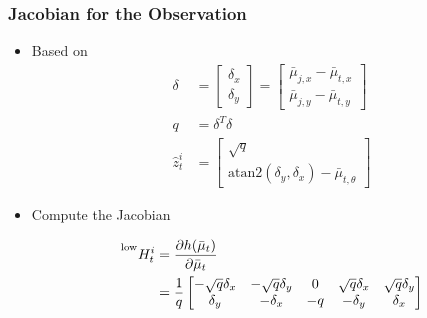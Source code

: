 \begin{frame}
    \frametitle{Jacobian for the Observation}

    \begin{itemize}
        \item Based on
        \begin{align*}
            \delta &= 
            \begin{bmatrix}
                \delta_x \\
                \delta_y
            \end{bmatrix}
            = \begin{bmatrix}
                \bar{\mu}_{j,x} - \bar{\mu}_{t,x} \\
                \bar{\mu}_{j,y} - \bar{\mu}_{t,y}
            \end{bmatrix}\\
            q &= \delta^T \delta\\
            \hat{z}^i_t &= 
            \begin{bmatrix}
                \sqrt{q} \\
                \text{atan2}(\delta_y, \delta_x) - \bar{\mu}_{t,\theta}
            \end{bmatrix}
        \end{align*}

        \item Compute the Jacobian
        
        \begin{align*}
            \prescript{\text{low}}{}{H^{i}_{t}} &= \frac{\partial h(\bar{\mu}_t)}{\partial \bar{\mu}_t}\\
            &= \frac{1}{q}
            \begin{bmatrix}
                -\sqrt{q} \delta_x & -\sqrt{q} \delta_y & 0 & \sqrt{q} \delta_x & \sqrt{q} \delta_y\\
                \delta_y & -\delta_x & -q & -\delta_y & \delta_x
            \end{bmatrix}
        \end{align*}
    \end{itemize}

\end{frame}


